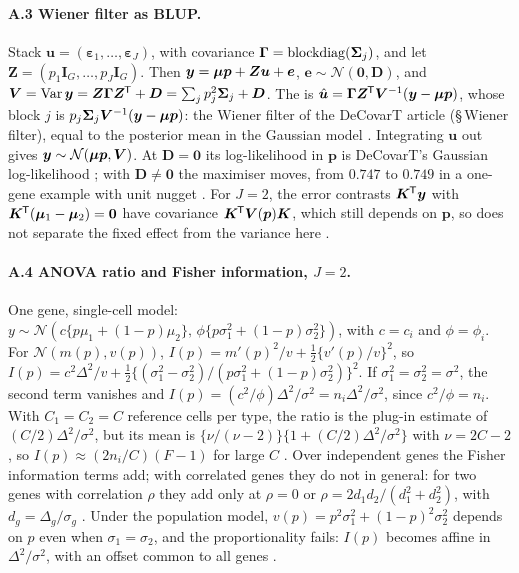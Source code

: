 \documentclass[11pt,a4paper]{article}
\begin{document}
\paragraph{A.3 Wiener filter as BLUP.}\label{app:blup} Stack $\bm u=(\bm\varepsilon_1,\dots,\bm\varepsilon_J)$,
with covariance $\bm\Gamma=\operatorname{blockdiag}(\bm{\Sigma}_j)$, and let $\bm Z=(p_1\bm I_G,\dots,p_J\bm I_G)$.
Then
$\bm y=\bm{\mu}\bm p+\bm Z\bm u+\bm e$, $\bm e\sim\mathcal N(\bm 0,\bm D)$, and $\bm V=\operatorname{Var}\bm y=\bm Z\bm\Gamma
\bm Z^{\mkern-1.5mu\mathsf{T}}+\bm D=\sum_jp_j^2\bm{\Sigma}_j+\bm D$. The  is
$\hat{\bm u}=\bm\Gamma\bm Z^{\mkern-1.5mu\mathsf{T}}\bm V^{-1}(\bm y-\bm{\mu}\bm p)$, whose block $j$ is
$p_j\bm{\Sigma}_j\bm V^{-1}(\bm y-\bm{\mu}\bm p)$: the Wiener filter of the DeCovarT article (\S\,Wiener filter),
equal to the posterior mean in the Gaussian model . Integrating $\bm u$ out gives
$\bm y\sim\mathcal N(\bm{\mu}\bm p,\bm V)$. At $\bm D=\bm 0$ its log-likelihood in $\bm p$ is DeCovarT's
Gaussian log-likelihood ; with $\bm D\neq\bm 0$ the maximiser moves, from $0.747$ to $0.749$ in
a one-gene example with unit nugget . For $J=2$, the error contrasts $\bm K^{\mkern-1.5mu\mathsf{T}}\bm y$ with
$\bm K^{\mkern-1.5mu\mathsf{T}}(\bm{\mu}_1-\bm{\mu}_2)=\bm 0$ have covariance $\bm K^{\mkern-1.5mu\mathsf{T}}\bm V(\bm p)\bm K$, which still depends on $\bm p$,
so  does not separate the fixed effect from the variance here .

\paragraph{A.4 ANOVA ratio and Fisher information, $J=2$.}\label{app:fisher} One gene, single-cell model:
$y\sim\mathcal N(c\{p\mu_1+(1-p)\mu_2\},\,\phi\{p\sigma_1^2+(1-p)\sigma_2^2\})$, with $c=c_i$ and
$\phi=\phi_i$. For $\mathcal N(m(p),v(p))$, $I(p)=m'(p)^2/v+\tfrac12\{v'(p)/v\}^2$, so
$I(p)=c^2\Delta^2/v+\tfrac12\{(\sigma_1^2-\sigma_2^2)/(p\sigma_1^2+(1-p)\sigma_2^2)\}^2$. If
$\sigma_1^2=\sigma_2^2=\sigma^2$, the second term vanishes and $I(p)=(c^2/\phi)\Delta^2/\sigma^2=
n_i\Delta^2/\sigma^2$, since $c^2/\phi=n_i$. With $C_1=C_2=C$ reference cells per type, the
 ratio is the plug-in estimate of $(C/2)\Delta^2/\sigma^2$, but its mean is
$\{\nu/(\nu-2)\}\{1+(C/2)\Delta^2/\sigma^2\}$ with $\nu=2C-2$, so $I(p)\approx(2n_i/C)(F-1)$ for large $C$
. Over independent genes the Fisher information terms add; with correlated genes they do not in general: for
two genes with correlation $\rho$ they add only at $\rho=0$ or $\rho=2d_1d_2/(d_1^2+d_2^2)$, with
$d_g=\Delta_g/\sigma_g$ . Under the population model, $v(p)=
p^2\sigma_1^2+(1-p)^2\sigma_2^2$ depends on $p$ even when $\sigma_1=\sigma_2$, and the proportionality fails:
$I(p)$ becomes affine in $\Delta^2/\sigma^2$, with an offset common to all genes .
\end{document}
